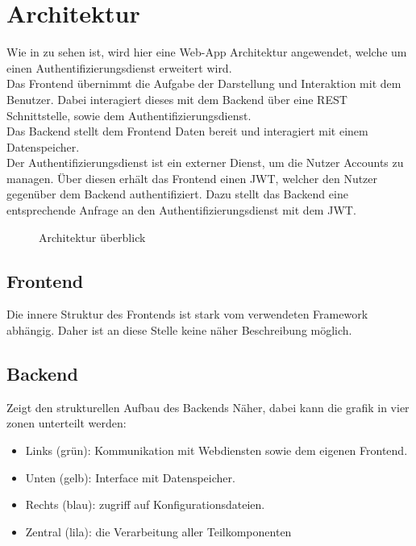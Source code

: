 \chapter{Architektur}\label{ch:architektur}
Wie in  zu sehen ist, wird hier eine Web-App Architektur angewendet,
welche um einen Authentifizierungsdienst erweitert wird.\\
Das Frontend übernimmt die Aufgabe der Darstellung und Interaktion mit dem Benutzer.
Dabei interagiert dieses mit dem Backend über eine \ac{REST} Schnittstelle, sowie dem Authentifizierungsdienst.\\
Das Backend stellt dem Frontend Daten bereit und interagiert mit einem Datenspeicher.\\
Der Authentifizierungsdienst ist ein externer Dienst, um die Nutzer Accounts zu managen.
Über diesen erhält das Frontend einen \ac{JWT}, welcher den Nutzer gegenüber dem Backend authentifiziert.
Dazu stellt das Backend eine entsprechende Anfrage an den Authentifizierungsdienst mit dem \ac{JWT}.

\begin{figure}[h]
    \centering
    
    \caption{Architektur überblick}\label{fig:HighLevelArch}
\end{figure}

\section{Frontend}\label{sec:frontend}

Die innere Struktur des Frontends ist stark vom verwendeten Framework abhängig.
Daher ist an diese Stelle keine näher Beschreibung möglich.

\section{Backend}\label{sec:fokus:-backend}

 Zeigt den strukturellen Aufbau des Backends Näher, dabei kann die grafik in vier zonen unterteilt werden:
\begin{itemize}
    \item Links (grün): Kommunikation mit Webdiensten sowie dem eigenen Frontend.
    \item Unten (gelb): Interface mit Datenspeicher.
    \item Rechts (blau): zugriff auf Konfigurationsdateien.
    \item Zentral (lila): die Verarbeitung aller Teilkomponenten
\end{itemize}

